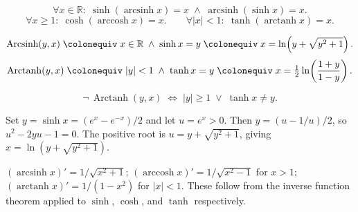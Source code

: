\begin{remark*}
\[
  \forall x\in\mathbb{R}:\;
  \sinh(\operatorname{arcsinh} x)=x
  \;\wedge\;
  \operatorname{arcsinh}(\sinh x)=x.
\]
\[
  \forall x\geq 1:\;
  \cosh(\operatorname{arccosh} x)=x.
  \qquad
  \forall |x|<1:\;
  \tanh(\operatorname{arctanh} x)=x.
\]
\end{remark*}

\begin{remark*}
\[
  \operatorname{Arcsinh}(y,x)
  \;\colonequiv\;
  x\in\mathbb{R} \;\wedge\; \sinh x = y
  \;\colonequiv\;
  x = \ln\!\left(y+\sqrt{y^2+1}\right).
\]
\[
  \operatorname{Arctanh}(y,x)
  \;\colonequiv\;
  |y|<1 \;\wedge\; \tanh x = y
  \;\colonequiv\;
  x = \tfrac{1}{2}\ln\!\left(\frac{1+y}{1-y}\right).
\]
\end{remark*}

\begin{remark*}
\[
  \neg\,\operatorname{Arctanh}(y,x)
  \;\iff\;
  |y|\geq 1 \;\vee\; \tanh x \neq y.
\]
\end{remark*}

\begin{remark*}
Set $y = \sinh x = (e^x - e^{-x})/2$ and let $u = e^x > 0$. Then
$y = (u - 1/u)/2$, so $u^2 - 2yu - 1 = 0$. The positive root is
$u = y + \sqrt{y^2+1}$, giving $x = \ln(y+\sqrt{y^2+1})$.
\end{remark*}

\begin{remark*}[Derivatives]
$(\operatorname{arcsinh} x)' = 1/\sqrt{x^2+1}$;\;
$(\operatorname{arccosh} x)' = 1/\sqrt{x^2-1}$ for $x > 1$;\;
$(\operatorname{arctanh} x)' = 1/(1-x^2)$ for $|x| < 1$.
These follow from the inverse function theorem applied to $\sinh$,
$\cosh$, and $\tanh$ respectively.
\end{remark*}
